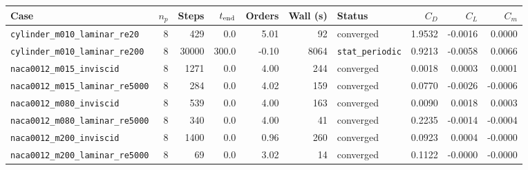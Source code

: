 \begin{tabular}{l r r r r r l r r r}
\toprule
Case & $n_p$ & Steps & $t_{\rm end}$ & Orders & Wall (s) & Status & $C_D$ & $C_L$ & $C_m$\\
\midrule
\texttt{cylinder\_m010\_laminar\_re20} & 8 & 429 & 0.0 & 5.01 & 92 & converged & 1.9532 & -0.0016 & 0.0000 \\
\texttt{cylinder\_m010\_laminar\_re200} & 8 & 30000 & 300.0 & -0.10 & 8064 & \texttt{stat\_periodic} & 0.9213 & -0.0058 & 0.0066 \\
\texttt{naca0012\_m015\_inviscid} & 8 & 1271 & 0.0 & 4.00 & 244 & converged & 0.0018 & 0.0003 & 0.0001 \\
\texttt{naca0012\_m015\_laminar\_re5000} & 8 & 284 & 0.0 & 4.02 & 159 & converged & 0.0770 & -0.0026 & -0.0006 \\
\texttt{naca0012\_m080\_inviscid} & 8 & 539 & 0.0 & 4.00 & 163 & converged & 0.0090 & 0.0018 & 0.0003 \\
\texttt{naca0012\_m080\_laminar\_re5000} & 8 & 340 & 0.0 & 4.00 & 41 & converged & 0.2235 & -0.0014 & -0.0004 \\
\texttt{naca0012\_m200\_inviscid} & 8 & 1400 & 0.0 & 0.96 & 260 & converged & 0.0923 & 0.0004 & -0.0000 \\
\texttt{naca0012\_m200\_laminar\_re5000} & 8 & 69 & 0.0 & 3.02 & 14 & converged & 0.1122 & -0.0000 & -0.0000 \\
\bottomrule
\end{tabular}
